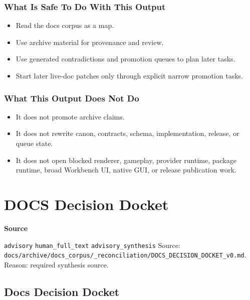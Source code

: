 \documentclass[9pt,a4paper,openany]{book}
\newcommand{\vonecallout}[3]{\par\medskip\noindent\begingroup\setlength{\fboxsep}{7pt}\colorbox{DomCalloutBg}{\parbox{0.94\linewidth}{\textbf{\textcolor{#1}{#2}}\par #3}}\endgroup\par\medskip}
\begin{document}
\subsubsection{What Is Safe To Do With This Output}

\begin{itemize}
\item Read the docs corpus as a map.\allowbreak{}
\item Use archive material for provenance and review.\allowbreak{}
\item Use generated contradictions and promotion queues to plan later tasks.\allowbreak{}
\item Start later live-\allowbreak{}doc patches only through explicit narrow promotion tasks.\allowbreak{}
\end{itemize}

\subsubsection{What This Output Does Not Do}

\begin{itemize}
\item It does not promote archive claims.\allowbreak{}
\item It does not rewrite canon, contracts, schema, implementation, release, or queue state.\allowbreak{}
\item It does not open blocked renderer, gameplay, provider runtime, package runtime, broad Workbench UI, native GUI, or release publication work.\allowbreak{}
\end{itemize}



\section{DOCS Decision Docket}

\vonecallout{DomSlate}{Source}{\texttt{advisory} \texttt{human\_\allowbreak{}full\_\allowbreak{}text} \texttt{advisory\_\allowbreak{}synthesis} Source: \texttt{docs/\allowbreak{}archive/\allowbreak{}docs\_\allowbreak{}corpus/\allowbreak{}\_\allowbreak{}reconciliation/\allowbreak{}DOCS\_\allowbreak{}DECISION\_\allowbreak{}DOCKET\_\allowbreak{}v0.\allowbreak{}md}.\allowbreak{} Reason: required synthesis source.\allowbreak{}}

\subsection{Docs Decision Docket}
\end{document}
